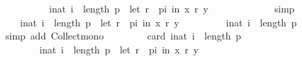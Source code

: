 \begin{isabellebody}
\ \ \ \ \ \ \ \ \ \ {\isacharbraceleft}{\kern0pt}i{\isacharcolon}{\kern0pt}{\isacharcolon}{\kern0pt}nat{\isachardot}{\kern0pt}\ i\ {\isacharless}{\kern0pt}\ length\ p\ {\isasymand}\ {\isacharparenleft}{\kern0pt}let\ r\ {\isacharequal}{\kern0pt}\ {\isacharparenleft}{\kern0pt}p{\isacharbang}{\kern0pt}i{\isacharparenright}{\kern0pt}\ in\ {\isacharparenleft}{\kern0pt}x\ {\isasympreceq}\isactrlsub r\ y{\isacharparenright}{\kern0pt}{\isacharparenright}{\kern0pt}{\isacharbraceright}{\kern0pt}{\isachardoublequoteclose}\isanewline
\ \ \ \ \isamarkupfalse%
\ {\isachardoublequoteopen}{}{}{\isachardoublequoteclose}\ {\isachardoublequoteopen}{}{\isachardoublequoteclose}\isanewline
\ \ \ \ \isamarkupfalse%
\ simp\isanewline
\ \ \isamarkupfalse%
\isanewline
\ \ \ \ {\isachardoublequoteopen}{\isacharbraceleft}{\kern0pt}i{\isacharcolon}{\kern0pt}{\isacharcolon}{\kern0pt}nat{\isachardot}{\kern0pt}\ i\ {\isacharless}{\kern0pt}\ length\ p\ {\isasymand}\ {\isacharparenleft}{\kern0pt}let\ r\ {\isacharequal}{\kern0pt}\ {\isacharparenleft}{\kern0pt}p{\isacharbang}{\kern0pt}i{\isacharparenright}{\kern0pt}\ in\ {\isacharparenleft}{\kern0pt}x\ {\isasympreceq}\isactrlsub r\ y{\isacharparenright}{\kern0pt}{\isacharparenright}{\kern0pt}{\isacharbraceright}{\kern0pt}\ {\isasymsubseteq}\isanewline
\ \ \ \ \ \ \ \ {\isacharbraceleft}{\kern0pt}i{\isacharcolon}{\kern0pt}{\isacharcolon}{\kern0pt}nat{\isachardot}{\kern0pt}\ i\ {\isacharless}{\kern0pt}\ length\ p{\isacharbraceright}{\kern0pt}{\isachardoublequoteclose}\isanewline
\ \ \ \ \isamarkupfalse%
\ {\isacharparenleft}{\kern0pt}simp\ add{\isacharcolon}{\kern0pt}\ Collect{\isacharunderscore}{\kern0pt}mono{\isacharparenright}{\kern0pt}\isanewline
\ \ \isamarkupfalse%
\ {}{}{\isacharcolon}{\kern0pt}\isanewline
\ \ \ \ {\isachardoublequoteopen}card\ {\isacharparenleft}{\kern0pt}{\isacharbraceleft}{\kern0pt}i{\isacharcolon}{\kern0pt}{\isacharcolon}{\kern0pt}nat{\isachardot}{\kern0pt}\ i\ {\isacharless}{\kern0pt}\ length\ p{\isacharbraceright}{\kern0pt}\ {\isacharminus}{\kern0pt}\isanewline
\ \ \ \ \ \ \ \ {\isacharbraceleft}{\kern0pt}i{\isacharcolon}{\kern0pt}{\isacharcolon}{\kern0pt}nat{\isachardot}{\kern0pt}\ i\ {\isacharless}{\kern0pt}\ length\ p\ {\isasymand}\ {\isacharparenleft}{\kern0pt}let\ r\ {\isacharequal}{\kern0pt}\ {\isacharparenleft}{\kern0pt}p{\isacharbang}{\kern0pt}i{\isacharparenright}{\kern0pt}\ in\ {\isacharparenleft}{\kern0pt}x\ {\isasympreceq}\isactrlsub r\ y{\isacharparenright}{\kern0pt}{\isacharparenright}{\kern0pt}{\isacharbraceright}{\kern0pt}{\isacharparenright}{\kern0pt}\ {\isacharequal}{\kern0pt}\isanewline

\end{isabellebody}
